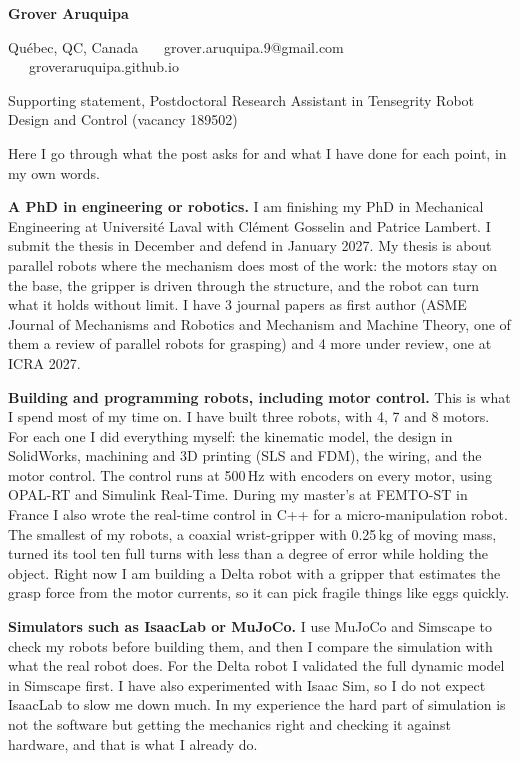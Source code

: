 \documentclass[11pt,a4paper]{article}
\begin{document}
{\large\bfseries Grover Aruquipa}\par\vspace{-5pt}
{\small Qu\'ebec, QC, Canada \ \textbullet\ \ grover.aruquipa.9@gmail.com \ \textbullet\ \ groveraruquipa.github.io}

\vspace{2pt}
Supporting statement, Postdoctoral Research Assistant in Tensegrity Robot Design and Control (vacancy 189502)

Here I go through what the post asks for and what I have done for each point, in my own words.

\textbf{A PhD in engineering or robotics.}
I am finishing my PhD in Mechanical Engineering at Universit\'e Laval with Cl\'ement Gosselin and Patrice Lambert. I submit the thesis in December and defend in January 2027. My thesis is about parallel robots where the mechanism does most of the work: the motors stay on the base, the gripper is driven through the structure, and the robot can turn what it holds without limit. I have 3 journal papers as first author (ASME Journal of Mechanisms and Robotics and Mechanism and Machine Theory, one of them a review of parallel robots for grasping) and 4 more under review, one at ICRA 2027.

\textbf{Building and programming robots, including motor control.}
This is what I spend most of my time on. I have built three robots, with 4, 7 and 8 motors. For each one I did everything myself: the kinematic model, the design in SolidWorks, machining and 3D printing (SLS and FDM), the wiring, and the motor control. The control runs at 500\,Hz with encoders on every motor, using OPAL-RT and Simulink Real-Time. During my master's at FEMTO-ST in France I also wrote the real-time control in C++ for a micro-manipulation robot. The smallest of my robots, a coaxial wrist-gripper with 0.25\,kg of moving mass, turned its tool ten full turns with less than a degree of error while holding the object. Right now I am building a Delta robot with a gripper that estimates the grasp force from the motor currents, so it can pick fragile things like eggs quickly.

\textbf{Simulators such as IsaacLab or MuJoCo.}
I use MuJoCo and Simscape to check my robots before building them, and then I compare the simulation with what the real robot does. For the Delta robot I validated the full dynamic model in Simscape first. I have also experimented with Isaac Sim, so I do not expect IsaacLab to slow me down much. In my experience the hard part of simulation is not the software but getting the mechanics right and checking it against hardware, and that is what I already do.
\end{document}
